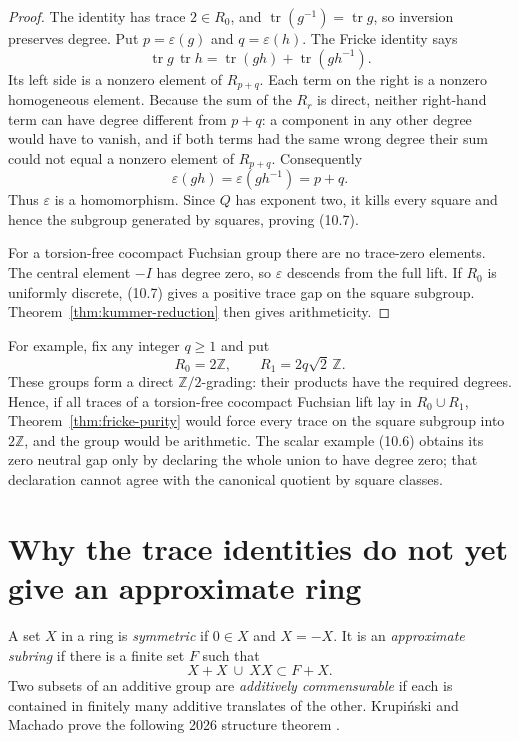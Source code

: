 \documentclass[11pt,reqno]{amsart}
\theoremstyle{definition}
\theoremstyle{remark}
\newcommand{\Z}{\mathbb Z}
\newcommand{\Tr}{\operatorname{tr}}
\begin{document}
\begin{proof}
The identity has trace \(2\in R_0\), and
\(\Tr(g^{-1})=\Tr g\), so inversion preserves degree.  Put
\(p=\varepsilon(g)\) and \(q=\varepsilon(h)\).  The Fricke identity says
\[
 \Tr g\,\Tr h=\Tr(gh)+\Tr(gh^{-1}).
\tag{10.8}
\]
Its left side is a nonzero element of \(R_{p+q}\).  Each term on the right
is a nonzero homogeneous element.  Because the sum of the \(R_r\) is direct,
neither right-hand term can have degree different from \(p+q\): a component
in any other degree would have to vanish, and if both terms had the same
wrong degree their sum could not equal a nonzero element of \(R_{p+q}\).
Consequently
\[
 \varepsilon(gh)=\varepsilon(gh^{-1})=p+q.
\]
Thus \(\varepsilon\) is a homomorphism.  Since \(Q\) has exponent two, it
kills every square and hence the subgroup generated by squares, proving
(10.7).

For a torsion-free cocompact Fuchsian group there are no trace-zero elements.
The central element \(-I\) has degree zero, so \(\varepsilon\) descends from
the full lift.  If \(R_0\) is uniformly discrete, (10.7) gives a positive
trace gap on the square subgroup.  Theorem~\ref{thm:kummer-reduction} then
gives arithmeticity.
\end{proof}

For example, fix any integer \(q\ge1\) and put
\[
 R_0=2\Z,\qquad R_1=2q\sqrt2\,\Z.
\]
These groups form a direct \(\Z/2\)-grading: their products have the required
degrees.  Hence, if all traces of a torsion-free cocompact Fuchsian lift lay
in \(R_0\cup R_1\), Theorem~\ref{thm:fricke-purity} would force every trace
on the square subgroup into \(2\Z\), and the group would be arithmetic.  The
scalar example (10.6) obtains its zero neutral gap only by declaring the whole
union to have degree zero; that declaration cannot agree with the canonical
quotient by square classes.

\section{Why the trace identities do not yet give an approximate ring}

A set \(X\) in a ring is \emph{symmetric} if \(0\in X\) and \(X=-X\).
It is an \emph{approximate subring} if there is a finite set \(F\) such that
\[
 X+X\ \cup\ XX\subset F+X.
\]
Two subsets of an additive group are \emph{additively commensurable} if each
is contained in finitely many additive translates of the other.
Krupi\'nski and Machado prove the following 2026 structure theorem
\cite{KrupinskiMachado}.
\end{document}
